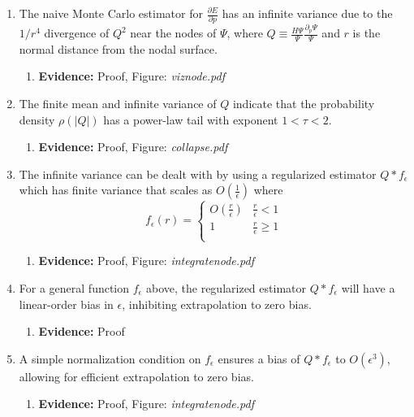 \documentclass{article}
\begin{document}
\begin{enumerate}
\item The naive Monte Carlo estimator for $\frac{\partial E}{\partial p}$ has an infinite variance due to the $1/r^4$ divergence of $Q^2$ near the nodes of $\Psi$, where $Q \equiv \frac{H\Psi}{\Psi} \frac{\partial_p \Psi}{\Psi}$ and $r$ is the normal distance from the nodal surface.
\begin{enumerate}
\item \textbf{Evidence:} Proof, Figure: \textit{viznode.pdf}
\end{enumerate}

\item The finite mean and infinite variance of $Q$ indicate that the probability density $\rho(|Q|)$ has a power-law tail with exponent $1 < \tau < 2$.
\begin{enumerate}
\item \textbf{Evidence:} Proof, Figure: \textit{collapse.pdf}
\end{enumerate}

\item The infinite variance can be dealt with by using a regularized estimator $Q * f_\epsilon$ which has finite variance that scales as $O(\frac{1}{\epsilon})$ where 
\[ f_\epsilon(r) = \begin{cases} 
      O(\frac{r}{\epsilon}) & \frac{r}{\epsilon} < 1 \\
      1 & \frac{r}{\epsilon} \ge 1 \\
   \end{cases}
\]
\begin{enumerate}

\item \textbf{Evidence:} Proof, Figure: \textit{integratenode.pdf}
\end{enumerate}

\item For a general function $f_\epsilon$ above, the regularized estimator $Q * f_\epsilon$ will have a linear-order bias in $\epsilon$, inhibiting extrapolation to zero bias.
\begin{enumerate}
\item \textbf{Evidence:} Proof
\end{enumerate}

\item A simple normalization condition on $f_\epsilon$ ensures a bias of $Q * f_\epsilon$ to $O(\epsilon^3)$, allowing for efficient extrapolation to zero bias.
\begin{enumerate}
\item \textbf{Evidence:} Proof, Figure: \textit{integratenode.pdf}
\end{enumerate}


\end{enumerate}
\end{document}
